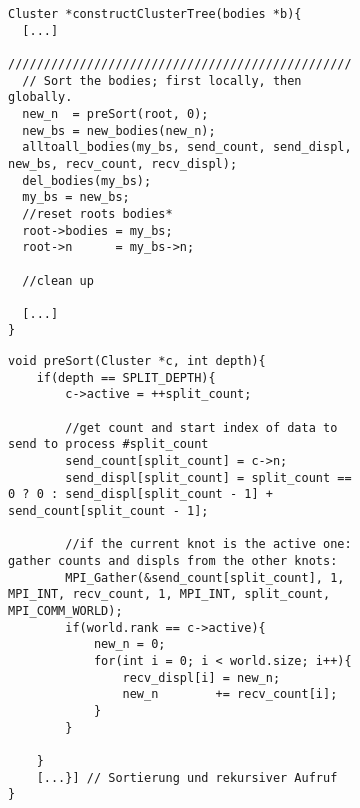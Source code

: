 \begin{figure}[b]
  \begin{subfigure}{0.9\textwidth}
    \begin{lstlisting}[label=lst:parconsttree, caption={Ausschnitt aus der parallelen Konstruktion des Clusterbaumes.}]
Cluster *constructClusterTree(bodies *b){
  [...]
  ////////////////////////////////////////////////////////
  // Sort the bodies; first locally, then globally.
  new_n  = preSort(root, 0);
  new_bs = new_bodies(new_n);
  alltoall_bodies(my_bs, send_count, send_displ, new_bs, recv_count, recv_displ);
  del_bodies(my_bs);
  my_bs = new_bs;
  //reset roots bodies*
  root->bodies = my_bs;
  root->n      = my_bs->n;
  
  //clean up
  
  [...]
}
    \end{lstlisting}
  \end{subfigure}
\end{figure}

\begin{figure}[t]
  \begin{subfigure}{0.9\textwidth}
    \begin{lstlisting}[label=lst:presort, caption={Diese Methode sortiert die lokalen \code{bodies} nach Prozesszugehörigkeit.}]
void preSort(Cluster *c, int depth){
    if(depth == SPLIT_DEPTH){
        c->active = ++split_count;
    
        //get count and start index of data to send to process #split_count
        send_count[split_count] = c->n;
        send_displ[split_count] = split_count == 0 ? 0 : send_displ[split_count - 1] + send_count[split_count - 1];
    
        //if the current knot is the active one: gather counts and displs from the other knots:
        MPI_Gather(&send_count[split_count], 1, MPI_INT, recv_count, 1, MPI_INT, split_count, MPI_COMM_WORLD);
        if(world.rank == c->active){
            new_n = 0;
            for(int i = 0; i < world.size; i++){
                recv_displ[i] = new_n;
                new_n        += recv_count[i];
            }
        }
        
    } 
    [...}] // Sortierung und rekursiver Aufruf
}
    \end{lstlisting}
  \end{subfigure}
\end{figure}
